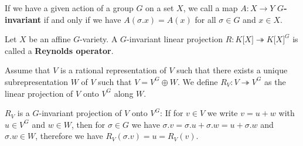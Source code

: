 
\begin{definition}
  If we have a given action of a group $G$ on a set $X$, we call a map $A \colon X \longrightarrow Y$ \textbf{$G$-invariant} if and only if we have $A(\sigma.x) = A(x)$ for all $\sigma \in G$ and $x \in X$.
\end{definition}

\begin{definition}
  Let $ X $ be an affine $G$-variety.
  A $ G $-invariant linear projection $R \colon K\lbrack X \rbrack \twoheadrightarrow K\lbrack X \rbrack^G $ is called a \textbf{Reynolds operator}. 
\end{definition}

\begin{definition}
  Assume that $V$ is a rational representation of $V$ such that there exists a unique subrepresentation $W$ of $V$ such that $V = V^G \oplus W$.
 We define $R_V \colon V \twoheadrightarrow V^G$ as the linear projection of $V$ onto $V^G$ along $W$.
\end{definition}

\begin{remark}
  $R_V$ is a $G$-invariant projection of $V$ onto $V^G$:
  If for $v \in V$ we write $v = u + w$ with $u \in V^G$ and $w \in W$, then for $\sigma \in G$ we have $\sigma.v = \sigma.u + \sigma.w = u + \sigma.w$ and $\sigma.w \in W$, therefore we have $R_V(\sigma.v) = u = R_V(v)$.
\end{remark}

